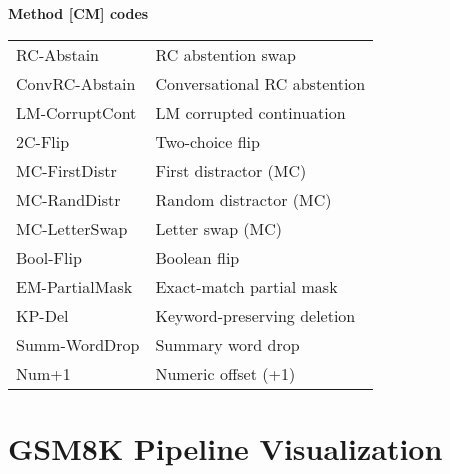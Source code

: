\documentclass{article}
\begin{document}
\begin{minipage}[t]{0.48\linewidth}
\textbf{Method [CM] codes}\\[3pt]
\begin{tabular}{@{}ll@{}}
RC-Abstain      & RC abstention swap \\
ConvRC-Abstain  & Conversational RC abstention \\
LM-CorruptCont  & LM corrupted continuation \\
2C-Flip         & Two-choice flip \\
MC-FirstDistr   & First distractor (MC) \\
MC-RandDistr    & Random distractor (MC) \\
MC-LetterSwap   & Letter swap (MC) \\
Bool-Flip       & Boolean flip \\
EM-PartialMask  & Exact-match partial mask \\
KP-Del          & Keyword-preserving deletion \\
Summ-WordDrop   & Summary word drop \\
Num+1           & Numeric offset (+1) \\
\end{tabular}


\end{minipage}

\section{GSM8K Pipeline Visualization}
\end{document}
